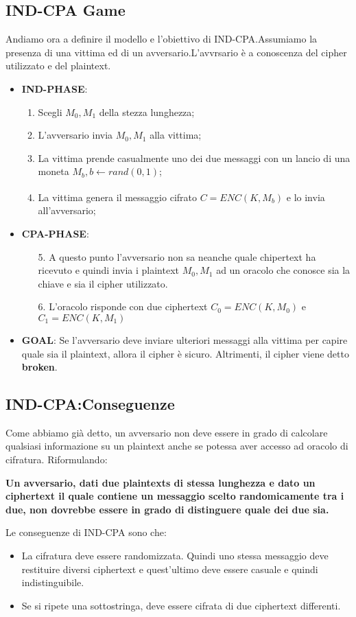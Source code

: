 \documentclass{article}
\theoremstyle{remark}
\begin{document}
\subsection{IND-CPA Game}
Andiamo ora a definire il modello e l'obiettivo di IND-CPA.Assumiamo la presenza di una vittima ed di un avversario.L'avvrsario è a conoscenza del cipher utilizzato e del plaintext.
\begin{itemize}
	\item \textbf{IND-PHASE}:
	      \begin{enumerate}
		      \item Scegli \(M_0,M_1\) della stezza lunghezza;
		      \item L'avversario invia \(M_0,M_1\) alla vittima;
		      \item La vittima prende casualmente uno dei due messaggi con un lancio di una moneta \(M_b,b\xleftarrow[]{} rand(0,1)\);
		      \item La vittima genera il messaggio cifrato \(C = ENC(K,M_b)\) e lo invia all'avversario;
	      \end{enumerate}
	\item \textbf{CPA-PHASE}:
	      \begin{enumerate}
		      \item[5.] A questo punto l'avversario non sa neanche quale chipertext ha ricevuto e quindi invia i plaintext \(M_0,M_1\) ad un oracolo che conosce sia la chiave e sia il cipher utilizzato.
		      \item[6.] L'oracolo risponde con due ciphertext \(C_0 = ENC(K,M_0)\) e \(C_1 = ENC(K,M_1)\)
	      \end{enumerate}
	\item \textbf{GOAL}: Se l'avversario deve inviare ulteriori messaggi alla vittima per capire quale sia il plaintext, allora il cipher è sicuro. Altrimenti, il cipher viene detto \textbf{broken}.
\end{itemize}
\subsection{IND-CPA:Conseguenze}
Come abbiamo già detto, un avversario non deve essere in grado di calcolare qualsiasi informazione su un plaintext anche se potessa aver accesso ad oracolo di cifratura. Riformulando:
\begin{center}
	\textbf{Un avversario, dati due plaintexts di stessa lunghezza e dato un ciphertext il quale contiene un messaggio scelto randomicamente tra i due, non dovrebbe essere in grado di distinguere quale dei due sia.}
\end{center}
Le conseguenze di IND-CPA sono che:
\begin{itemize}
	\item La cifratura deve essere randomizzata. Quindi uno stessa messaggio deve restituire diversi ciphertext e quest'ultimo deve essere casuale e quindi indistinguibile.
	\item Se si ripete una sottostringa, deve essere cifrata di due ciphertext differenti.
\end{itemize}
\end{document}

